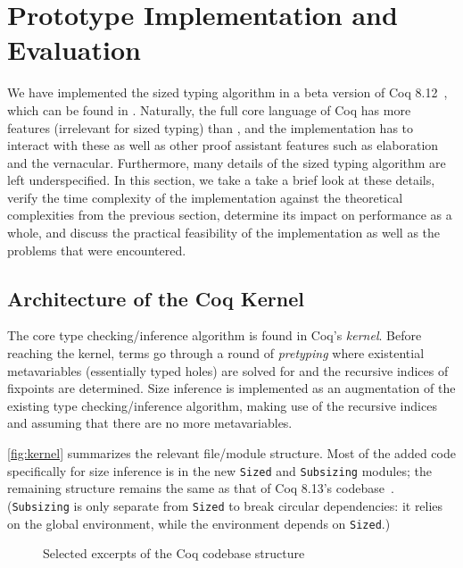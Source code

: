 \section{Prototype Implementation and Evaluation} \label{sec:impl}

We have implemented the sized typing algorithm in a beta version of Coq 8.12~\citep{impl},
which can be found in \citet{impl}.
Naturally, the full core language of Coq has more features (irrelevant for sized typing) than \lang,
and the implementation has to interact with these as well as other proof assistant features such as elaboration and the vernacular.
Furthermore, many details of the sized typing algorithm are left underspecified.
In this section, we take a take a brief look at these details,
verify the time complexity of the implementation against the theoretical complexities from the previous section,
determine its impact on performance as a whole,
and discuss the practical feasibility of the implementation as well as the problems that were encountered.

\subsection{Architecture of the Coq Kernel}

The core type checking/inference algorithm is found in Coq's \emph{kernel}.
Before reaching the kernel, terms go through a round of \emph{pretyping}
where existential metavariables (essentially typed holes) are solved for
and the recursive indices of fixpoints are determined.
Size inference is implemented as an augmentation of the existing type checking/inference algorithm,
making use of the recursive indices and assuming that there are no more metavariables.

\autoref{fig:kernel} summarizes the relevant file/module structure.
Most of the added code specifically for size inference is in the new \texttt{Sized} and \texttt{Subsizing} modules;
the remaining structure remains the same as that of Coq 8.13's codebase~\citep{coq}.
(\texttt{Subsizing} is only separate from \texttt{Sized} to break circular dependencies: it relies on the global environment, while the environment depends on \texttt{Sized}.)

\begin{figure}
\caption{Selected excerpts of the Coq codebase structure}
\label{fig:kernel}
\end{figure}

